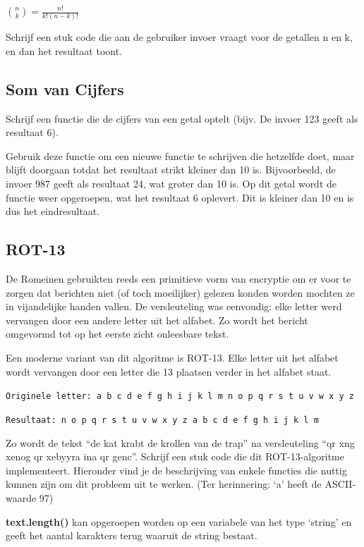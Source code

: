 $\binom{n}{k} = \frac{n!}{k!(n-k)!}$

Schrijf een stuk code die aan de gebruiker invoer vraagt voor de getallen n en k, en dan het resultaat toont.

\subsection{Som van Cijfers}

Schrijf een functie die de cijfers van een getal optelt (bijv. De invoer 123 geeft als resultaat 6).

Gebruik deze functie om een nieuwe functie te schrijven die hetzelfde doet, maar blijft doorgaan totdat het resultaat strikt kleiner dan 10 is. Bijvoorbeeld, de invoer 987 geeft als resultaat 24, wat groter dan 10 is. Op dit getal wordt de functie weer opgeroepen, wat het resultaat 6 oplevert. Dit is kleiner dan 10 en is dus het eindresultaat.

\subsection{ROT-13}

De Romeinen gebruikten reeds een primitieve vorm van encryptie om er voor te zorgen dat berichten niet (of toch moeilijker) gelezen konden worden mochten ze in vijandelijke handen vallen. De versleuteling was eenvoudig: elke letter werd vervangen door een andere letter uit het alfabet. Zo wordt het bericht omgevormd tot op het eerste zicht onleesbare tekst.

Een moderne variant van dit algoritme is ROT-13. Elke letter uit het alfabet wordt vervangen door een letter die 13 plaatsen verder in het alfabet staat.

\texttt{Originele letter: a b c d e f g h i j k l m n o p q r s t u v w x y z}

\texttt{Resultaat:        n o p q r s t u v w x y z a b c d e f g h i j k l m}

Zo wordt de tekst ``de kat krabt de krollen van de trap'' na versleuteling ``qr xng xenog qr xebyyra ina qr genc''. Schrijf een stuk code die dit ROT-13-algoritme implementeert. Hieronder vind je de beschrijving van enkele functies die nuttig kunnen zijn om dit probleem uit te werken. (Ter herinnering: `a' heeft de ASCII-waarde 97)

\textbf{text.length()} kan opgeroepen worden op een variabele van het type `string' en geeft het aantal karakters terug waaruit de string bestaat.

